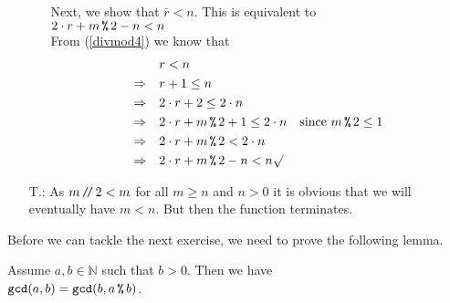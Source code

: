 \begin{enumerate}
\begin{enumerate}
    Next, we show that $\bar{r} < n$. This is equivalent to
    \\[0.2cm]
    \hspace*{1.3cm}
    $2 \cdot r + m \,\texttt{\%}\, 2 - n < n$
    \\[0.2cm]
    From (\ref{divmod4}) we know that
    \begin{align*}
                       & r < n \\
      \Rightarrow\quad & r + 1 \leq n \\
      \Rightarrow\quad & 2 \cdot r + 2 \leq 2 \cdot n \\
      \Rightarrow\quad & 2 \cdot r + m \mmod 2 + 1 \leq 2 \cdot n \quad \mbox{since $m \mmod 2 \leq 1$} \\
      \Rightarrow\quad & 2 \cdot r + m \mmod 2 < 2 \cdot n \\
      \Rightarrow\quad & 2 \cdot r + m \mmod 2 - n < n \green{\surd}
    \end{align*}
  \end{enumerate}
\item[T.:] As $m \dv 2 < m$ for all $m \geq n$ and $n > 0$ it is obvious that we will eventually have
  $m  < n$. But then the function  terminates.
\end{enumerate}

Before we can tackle the next exercise, we need to prove the following lemma.
\begin{Lemma}[Euclid]
  Assume $a, b \in \mathbb{N}$ such that $b > 0$.  Then we have
  \\[0.2cm]
  \hspace*{1.3cm}
  $\mathtt{gcd}(a, b) = \mathtt{gcd}(b, a \,\texttt{\%}\, b)$.
\end{Lemma}

